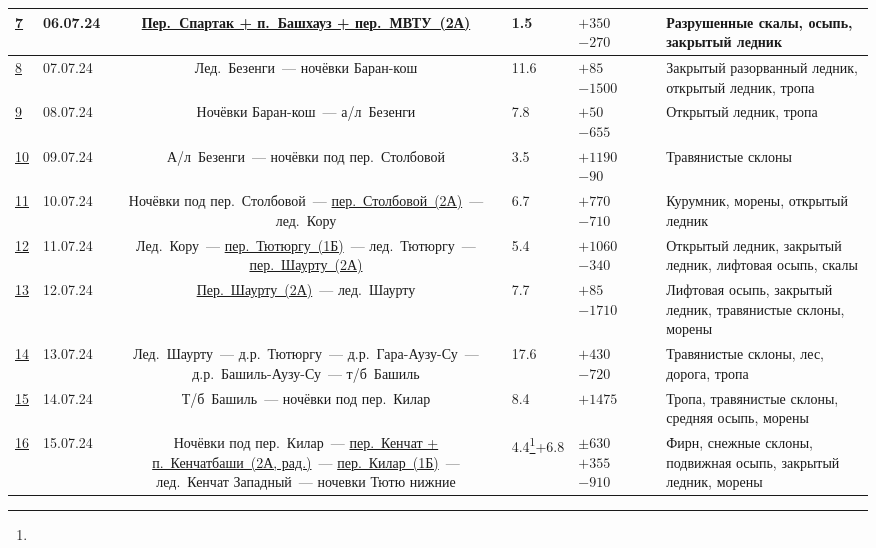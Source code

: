 {\begin{longtable}{|A|B|C|B|B|D|E|}
			\hyperref[subsec:Day7]{7}	&	06.07.24	&	\hyperref[subsec:main_obstacles]{Пер.~Спартак + п.~Башхауз + пер.~МВТУ~(2А)}																																&	1.5							&	$+350$ $-270$	 		&			&	Разрушенные скалы, осыпь, закрытый ледник									\\ \hline
			\hyperref[subsec:Day8]{8}	&	07.07.24	&	Лед.~Безенги~--- ночёвки Баран-кош																																											&	11.6						&	$+85$ $-1500$	 		&			&	Закрытый разорванный ледник, открытый ледник, тропа							\\ \hline
			\hyperref[subsec:Day9]{9}	&	08.07.24	&	Ночёвки Баран-кош~--- а/л~Безенги																																											&	7.8							&	$+50$ $-655$	 		&			&	Открытый ледник, тропа														\\ \hline
			\hyperref[subsec:Day10]{10}	&	09.07.24	&	А/л~Безенги~--- ночёвки под пер.~Столбовой 																																									&	3.5							&	$+1190$ $-90$	 		&			&	Травянистые склоны															\\ \hline
			\hyperref[subsec:Day11]{11}	&	10.07.24	&	Ночёвки под пер.~Столбовой~--- \hyperref[subsec:main_obstacles]{пер.~Столбовой~(2А)}~--- лед.~Кору 																											&	6.7							&	$+770$ $-710$	 		&			&	Курумник, морены, открытый ледник											\\ \hline
			\hyperref[subsec:Day12]{12}	&	11.07.24	&	Лед.~Кору~--- \hyperref[subsec:main_obstacles]{пер.~Тютюргу~(1Б)}~--- лед.~Тютюргу~--- \hyperref[subsec:main_obstacles]{пер.~Шаурту~(2А)}																	&	5.4							&	$+1060$ $-340$	 		&			&	Открытый ледник, закрытый ледник, лифтовая осыпь, скалы						\\ \hline
			\hyperref[subsec:Day13]{13}	&	12.07.24	&	\hyperref[subsec:main_obstacles]{Пер.~Шаурту~(2А)}~--- лед.~Шаурту 																																			&	7.7							&	$+85$ $-1710$	 		&			&	Лифтовая осыпь, закрытый ледник, травянистые склоны, морены					\\ \hline
			\hyperref[subsec:Day14]{14}	&	13.07.24	&	Лед.~Шаурту~--- д.р.~Тютюргу~--- д.р.~Гара-Аузу-Су~--- д.р.~Башиль-Аузу-Су~--- т/б~Башиль																													&	17.6						&	$+430$ $-720$	 		&			&	Травянистые склоны, лес, дорога, тропа										\\ \hline
			\hyperref[subsec:Day15]{15}	&	14.07.24	&	Т/б~Башиль~--- ночёвки под пер.~Килар																																										&	8.4							&	$+1475$ 		 		&			&	Тропа, травянистые склоны, средняя осыпь, морены							\\ \hline
			\hyperref[subsec:Day16]{16}	&	15.07.24	&	Ночёвки под пер.~Килар~--- \hyperref[subsec:main_obstacles]{пер.~Кенчат + п.~Кенчатбаши~(2А, рад.)}~--- \hyperref[subsec:main_obstacles]{пер.~Килар~(1Б)}~--- лед.~Кенчат Западный~--- ночевки Тютю нижние	&	4.4\footnote{\textTwo}+6.8	&	$\pm 630$ $+355$ $-910$	&			&	Фирн, снежные склоны, подвижная осыпь, закрытый ледник, морены				\\ \hline

\end{longtable}}
